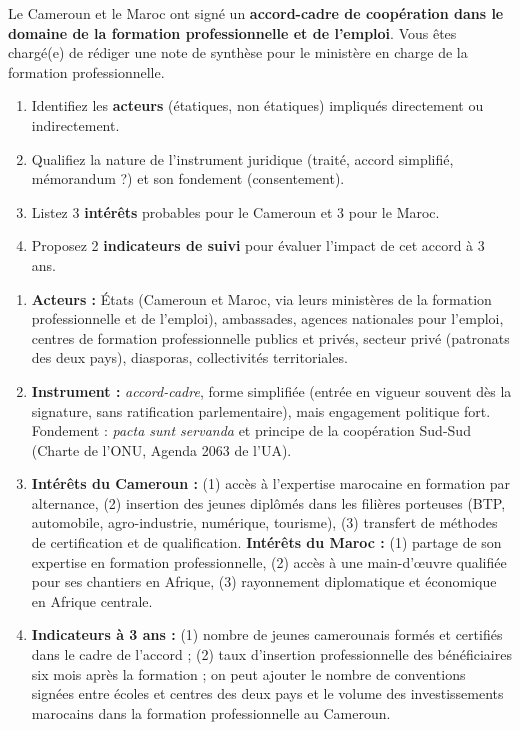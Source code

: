 \documentclass[11pt]{article}
\begin{document}
\begin{exercice}
Le Cameroun et le Maroc ont signé un \textbf{accord-cadre de coopération dans le domaine de la formation professionnelle et de l'emploi}. Vous êtes chargé(e) de rédiger une note de synthèse pour le ministère en charge de la formation professionnelle.
\begin{enumerate}
\item Identifiez les \textbf{acteurs} (étatiques, non étatiques) impliqués directement ou indirectement.
\item Qualifiez la nature de l'instrument juridique (traité, accord simplifié, mémorandum ?) et son fondement (consentement).
\item Listez 3 \textbf{intérêts} probables pour le Cameroun et 3 pour le Maroc.
\item Proposez 2 \textbf{indicateurs de suivi} pour évaluer l'impact de cet accord à 3 ans.
\end{enumerate}
\end{exercice}

\begin{corrige}[Exercice n°1]
\begin{enumerate}
\item \textbf{Acteurs :} États (Cameroun et Maroc, via leurs ministères de la formation professionnelle et de l'emploi), ambassades, agences nationales pour l'emploi, centres de formation professionnelle publics et privés, secteur privé (patronats des deux pays), diasporas, collectivités territoriales.
\item \textbf{Instrument :} \emph{accord-cadre}, forme simplifiée (entrée en vigueur souvent dès la signature, sans ratification parlementaire), mais engagement politique fort. Fondement : \emph{pacta sunt servanda} et principe de la coopération Sud-Sud (Charte de l'ONU, Agenda 2063 de l'UA).
\item \textbf{Intérêts du Cameroun :} (1) accès à l'expertise marocaine en formation par alternance, (2) insertion des jeunes diplômés dans les filières porteuses (BTP, automobile, agro-industrie, numérique, tourisme), (3) transfert de méthodes de certification et de qualification. \textbf{Intérêts du Maroc :} (1) partage de son expertise en formation professionnelle, (2) accès à une main-d'œuvre qualifiée pour ses chantiers en Afrique, (3) rayonnement diplomatique et économique en Afrique centrale.
\item \textbf{Indicateurs à 3 ans :} (1) nombre de jeunes camerounais formés et certifiés dans le cadre de l'accord ; (2) taux d'insertion professionnelle des bénéficiaires six mois après la formation ; on peut ajouter le nombre de conventions signées entre écoles et centres des deux pays et le volume des investissements marocains dans la formation professionnelle au Cameroun.
\end{enumerate}
\end{corrige}
\end{document}
